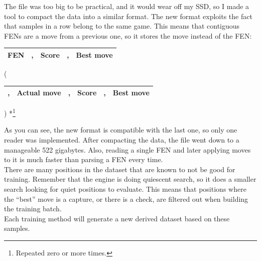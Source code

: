
The file was too big to be practical, and it would wear off my SSD, so I made a tool to compact the data into a similar format. The new format exploits the fact that samples in a row belong to the same game. This means that contiguous FENs are a move from a previous one, so it stores the move instead of the FEN:

\begin{center}
\begin{tabular}{|cp{0.0005cm}cp{0.0005cm}c|}
\hline
\textbf{FEN} & , & \textbf{Score} & , & \textbf{Best move} \\
\hline
\end{tabular}
(
\begin{tabular}{|p{0.0005cm}cp{0.0005cm}cp{0.0005cm}c|}
\hline
, & \textbf{Actual move} & , & \textbf{Score} & , & \textbf{Best move} \\
\hline
\end{tabular}
) *\footnote{Repeated zero or more times.}
\end{center}

As you can see, the new format is compatible with the last one, so only one reader was implemented. After compacting the data, the file went down to a manageable 522 gigabytes. Also, reading a single FEN and later applying moves to it is much faster than parsing a FEN every time. \\

There are many positions in the dataset that are known to not be good for training. Remember that the engine is doing quiescent search, so it does a smaller search looking for quiet positions to evaluate. This means that positions where the \enquote{best} move is a capture, or there is a check, are filtered out when building the training batch. \\

Each training method will generate a new derived dataset based on these samples.


